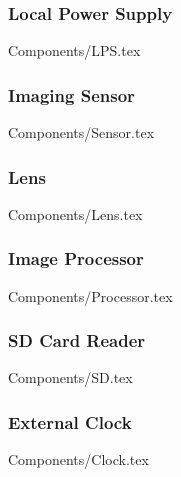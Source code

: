 \subsubsection{Local Power Supply}
{Components/LPS.tex}

\subsubsection{Imaging Sensor}
{Components/Sensor.tex}


\subsubsection{Lens}
{Components/Lens.tex}

\subsubsection{Image Processor} \label{sec:image-processor}
{Components/Processor.tex}

\subsubsection{SD Card Reader}
{Components/SD.tex}


\subsubsection{External Clock}\label{sec:ext-clk}
{Components/Clock.tex}